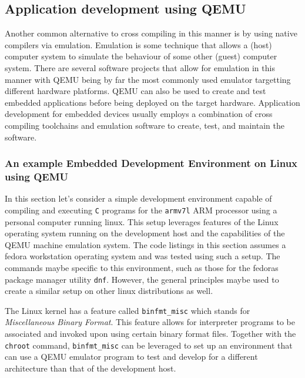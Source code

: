 \subsection{Application development using QEMU}

Another common alternative to cross compiling in this manner is by using native compilers via emulation. Emulation is some technique that allows a (host) computer system to simulate the behaviour of some other (guest) computer system. There are several software projects that allow for emulation in this manner with QEMU being by far the most commonly used emulator targetting different hardware platforms. QEMU can also be used to create and test embedded applications before being deployed on the target hardware. Application development for embedded devices usually employs a combination of cross compiling toolchains and emulation software to create, test, and maintain the software.

\subsubsection{An example Embedded Development Environment on Linux using QEMU}


In this section let's consider a simple development environment capable of compiling and executing \texttt{C} programs for the \texttt{armv7l} ARM processor using a personal computer running linux. This setup leverages features of the Linux operating system running on the development host and the capabilities of the QEMU machine emulation system. The code listings in this section assumes a fedora workstation operating system and was tested using such a setup. The commands maybe specific to this environment, such as those for the fedora\textquotesingle s package manager utility \texttt{dnf}. However, the general principles maybe used to create a similar setup on other linux distributions as well.

The Linux kernel has a feature called \texttt{binfmt\_misc} which stands for \textit{Miscellaneous Binary Format}. This feature allows for interpreter programs to be associated and invoked upon using certain binary format files. Together with the \texttt{chroot} command, \texttt{binfmt\_misc} can be leveraged to set up an environment that can use a QEMU emulator program to test and develop for a different architecture than that of the development host.

